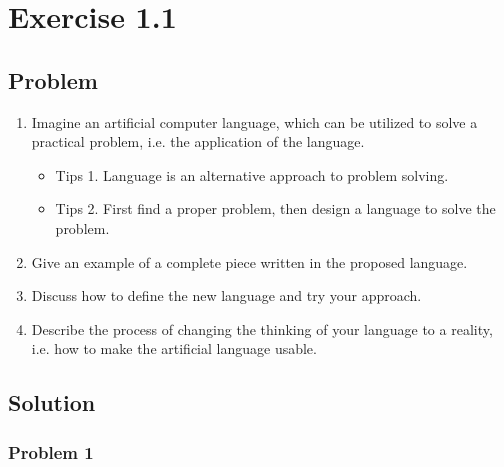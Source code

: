 

\chapter{Exercise 1.1}

\section{Problem}

\begin{enumerate}
    \item Imagine an artificial computer language, which can be utilized to solve a practical problem, i.e. the application of the language.
    \begin{itemize}
        \item Tips 1. Language is an alternative approach to problem solving.
        \item Tips 2. First find a proper problem, then design a language to solve the problem.
    \end{itemize}
    \item Give an example of a complete piece written in the proposed language.
    \item Discuss how to define the new language and try your approach.
    \item Describe the process of changing the thinking of your language to a reality, i.e. how to make the artificial language usable.
\end{enumerate}

\section{Solution}

\subsection{Problem 1}


